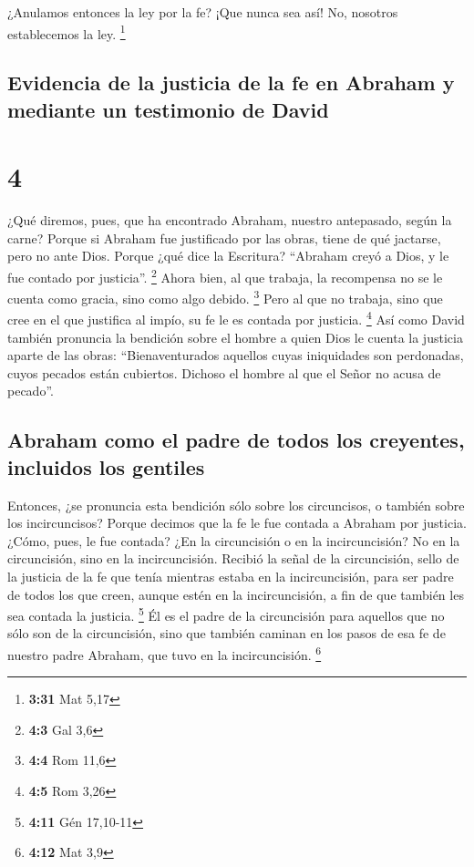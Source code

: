  ¿Anulamos entonces la ley por la fe? ¡Que nunca sea así!
No, nosotros establecemos la ley. \footnote{\textbf{3:31} Mat 5,17}

\hypertarget{evidencia-de-la-justicia-de-la-fe-en-abraham-y-mediante-un-testimonio-de-david}{%
\subsection{Evidencia de la justicia de la fe en Abraham y mediante un
testimonio de
David}\label{evidencia-de-la-justicia-de-la-fe-en-abraham-y-mediante-un-testimonio-de-david}}

\hypertarget{section-3}{%
\section{4}\label{section-3}}

 ¿Qué diremos, pues, que ha encontrado Abraham, nuestro
antepasado, según la carne?  Porque si Abraham fue
justificado por las obras, tiene de qué jactarse, pero no ante Dios.
 Porque ¿qué dice la Escritura? ``Abraham creyó a Dios, y
le fue contado por justicia''. \footnote{\textbf{4:3} Gal 3,6}
 Ahora bien, al que trabaja, la recompensa no se le cuenta
como gracia, sino como algo debido. \footnote{\textbf{4:4} Rom 11,6}
 Pero al que no trabaja, sino que cree en el que justifica
al impío, su fe le es contada por justicia. \footnote{\textbf{4:5} Rom
  3,26}  Así como David también pronuncia la bendición
sobre el hombre a quien Dios le cuenta la justicia aparte de las obras:
 ``Bienaventurados aquellos cuyas iniquidades son
perdonadas, cuyos pecados están cubiertos.  Dichoso el
hombre al que el Señor no acusa de pecado''.

\hypertarget{abraham-como-el-padre-de-todos-los-creyentes-incluidos-los-gentiles}{%
\subsection{Abraham como el padre de todos los creyentes, incluidos los
gentiles}\label{abraham-como-el-padre-de-todos-los-creyentes-incluidos-los-gentiles}}

 Entonces, ¿se pronuncia esta bendición sólo sobre los
circuncisos, o también sobre los incircuncisos? Porque decimos que la fe
le fue contada a Abraham por justicia.  ¿Cómo, pues, le
fue contada? ¿En la circuncisión o en la incircuncisión? No en la
circuncisión, sino en la incircuncisión.  Recibió la
señal de la circuncisión, sello de la justicia de la fe que tenía
mientras estaba en la incircuncisión, para ser padre de todos los que
creen, aunque estén en la incircuncisión, a fin de que también les sea
contada la justicia. \footnote{\textbf{4:11} Gén 17,10-11}
 Él es el padre de la circuncisión para aquellos que no
sólo son de la circuncisión, sino que también caminan en los pasos de
esa fe de nuestro padre Abraham, que tuvo en la incircuncisión.
\footnote{\textbf{4:12} Mat 3,9}

